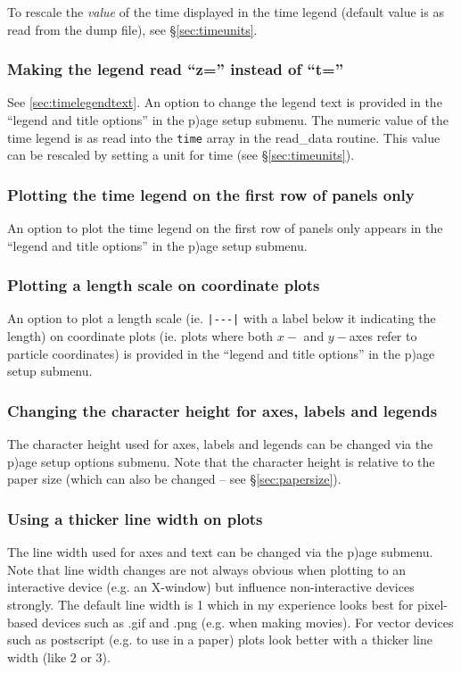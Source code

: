 \documentclass[a4paper,11pt]{article}
\begin{document}
 To rescale the \emph{value} of the time displayed in the time legend (default value is as read from the dump file), see \S\ref{sec:timeunits}.
 
\subsubsection{ Making the legend read ``z='' instead of ``t=''}
 See \ref{sec:timelegendtext}. An option to change the legend text is provided in the ``legend and title options'' in the p)age setup submenu. The numeric value of the time legend is as read into the \verb+time+ array in the read\_data routine. This value can be rescaled by setting a unit for time (see \S\ref{sec:timeunits}). 
  
\subsubsection{ Plotting the time legend on the first row of panels only}
 An option to plot the time legend on the first row of panels only appears in the ``legend and title options'' in the p)age setup submenu.

\subsubsection{ Plotting a length scale on coordinate plots}
 An option to plot a length scale (ie. \verb+|---|+ with a label below it indicating the length) on coordinate plots (ie. plots where both $x-$ and $y-$axes refer to particle coordinates) is provided in the ``legend and title options'' in the p)age setup submenu.

\subsubsection{ Changing the character height for axes, labels and legends}
 The character height used for axes, labels and legends can be changed via the p)age setup options submenu. Note that the character height is relative to the paper size (which can also be changed -- see \S\ref{sec:papersize}).

\subsubsection{ Using a thicker line width on plots}
 The line width used for axes and text can be changed via the p)age submenu. Note that line width changes are not always obvious when plotting to an interactive device (e.g. an X-window) but influence non-interactive devices strongly. The default line width is 1 which in my experience looks best for pixel-based devices such as .gif and .png (e.g. when making movies). For vector devices such as postscript (e.g. to use in a paper) plots look better with a thicker line width (like 2 or 3). 
\end{document}
